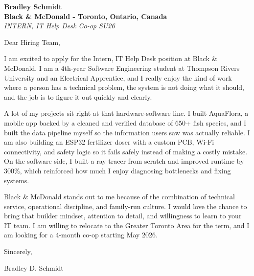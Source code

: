 \documentclass[11pt]{article}
\begin{document}
\textbf{Bradley Schmidt}\\
\vspace{0.5em}
\textbf{Black \& McDonald - Toronto, Ontario, Canada}\\
\textit{INTERN, IT Help Desk Co-op SU26}

Dear Hiring Team,

\par

I am excited to apply for the Intern, IT Help Desk position at Black \& McDonald. I am a 4th-year Software Engineering student at Thompson Rivers University and an Electrical Apprentice, and I really enjoy the kind of work where a person has a technical problem, the system is not doing what it should, and the job is to figure it out quickly and clearly.

\par

A lot of my projects sit right at that hardware-software line. I built AquaFlora, a mobile app backed by a cleaned and verified database of 650+ fish species, and I built the data pipeline myself so the information users saw was actually reliable. I am also building an ESP32 fertilizer doser with a custom PCB, Wi-Fi connectivity, and safety logic so it fails safely instead of making a costly mistake. On the software side, I built a ray tracer from scratch and improved runtime by 300\%, which reinforced how much I enjoy diagnosing bottlenecks and fixing systems.

\par

Black \& McDonald stands out to me because of the combination of technical service, operational discipline, and family-run culture. I would love the chance to bring that builder mindset, attention to detail, and willingness to learn to your IT team. I am willing to relocate to the Greater Toronto Area for the term, and I am looking for a 4-month co-op starting May 2026.

\par

Sincerely,

\par

Bradley D. Schmidt
\end{document}
